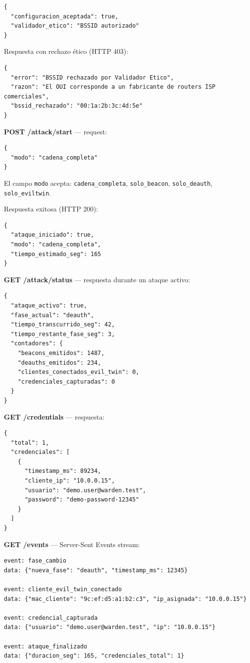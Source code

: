 \documentclass[11pt,a4paper]{article}
\begin{document}
\begin{lstlisting}
{
  "configuracion_aceptada": true,
  "validador_etico": "BSSID autorizado"
}
\end{lstlisting}

Respuesta con rechazo ético (HTTP 403):

\begin{lstlisting}
{
  "error": "BSSID rechazado por Validador Etico",
  "razon": "El OUI corresponde a un fabricante de routers ISP comerciales",
  "bssid_rechazado": "00:1a:2b:3c:4d:5e"
}
\end{lstlisting}

\textbf{POST /attack/start} — request:

\begin{lstlisting}
{
  "modo": "cadena_completa"
}
\end{lstlisting}

El campo \texttt{modo} acepta: \texttt{cadena\_completa},
\texttt{solo\_beacon}, \texttt{solo\_deauth}, \texttt{solo\_eviltwin}.

Respuesta exitosa (HTTP 200):

\begin{lstlisting}
{
  "ataque_iniciado": true,
  "modo": "cadena_completa",
  "tiempo_estimado_seg": 165
}
\end{lstlisting}

\textbf{GET /attack/status} — respuesta durante un ataque activo:

\begin{lstlisting}
{
  "ataque_activo": true,
  "fase_actual": "deauth",
  "tiempo_transcurrido_seg": 42,
  "tiempo_restante_fase_seg": 3,
  "contadores": {
    "beacons_emitidos": 1487,
    "deauths_emitidos": 234,
    "clientes_conectados_evil_twin": 0,
    "credenciales_capturadas": 0
  }
}
\end{lstlisting}

\textbf{GET /credentials} — respuesta:

\begin{lstlisting}
{
  "total": 1,
  "credenciales": [
    {
      "timestamp_ms": 89234,
      "cliente_ip": "10.0.0.15",
      "usuario": "demo.user@warden.test",
      "password": "demo-password-12345"
    }
  ]
}
\end{lstlisting}

\textbf{GET /events} — Server-Sent Events stream:

\begin{lstlisting}
event: fase_cambio
data: {"nueva_fase": "deauth", "timestamp_ms": 12345}

event: cliente_evil_twin_conectado
data: {"mac_cliente": "9c:ef:d5:a1:b2:c3", "ip_asignada": "10.0.0.15"}

event: credencial_capturada
data: {"usuario": "demo.user@warden.test", "ip": "10.0.0.15"}

event: ataque_finalizado
data: {"duracion_seg": 165, "credenciales_total": 1}
\end{lstlisting}
\end{document}
